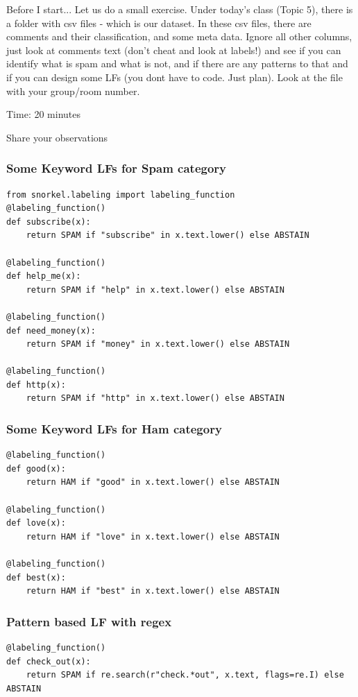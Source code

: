 \documentclass{beamer}
\begin{document}
\begin{frame}{Before I start...}
Let us do a small exercise. Under today's class (Topic 5), there is a folder with csv files - which is our dataset. In these csv files, there are comments and their classification, and some meta data. Ignore all other columns, just look at comments text (don't cheat and look at labels!) and see if you can identify what is spam and what is not, and if there are any patterns to that and if you can design some LFs (you dont have to code. Just plan). Look at the file with your group/room number. 

Time: 20 minutes
    
\end{frame}

\begin{frame}{}
    \Large Share your observations
\end{frame}

\begin{frame}[fragile]
\frametitle{Some Keyword LFs for Spam category}
\small
\begin{verbatim}
from snorkel.labeling import labeling_function
@labeling_function()
def subscribe(x):
    return SPAM if "subscribe" in x.text.lower() else ABSTAIN

@labeling_function()
def help_me(x):
    return SPAM if "help" in x.text.lower() else ABSTAIN

@labeling_function()
def need_money(x):
    return SPAM if "money" in x.text.lower() else ABSTAIN

@labeling_function()
def http(x):
    return SPAM if "http" in x.text.lower() else ABSTAIN
\end{verbatim}
\end{frame}

\begin{frame}[fragile]
\frametitle{Some Keyword LFs for Ham category}
\small
\begin{verbatim}
@labeling_function()
def good(x):
    return HAM if "good" in x.text.lower() else ABSTAIN

@labeling_function()
def love(x):
    return HAM if "love" in x.text.lower() else ABSTAIN

@labeling_function()
def best(x):
    return HAM if "best" in x.text.lower() else ABSTAIN
\end{verbatim}
\end{frame}

\begin{frame}[fragile]
\frametitle{Pattern based LF with regex}
\small
\begin{verbatim}
@labeling_function()
def check_out(x):
    return SPAM if re.search(r"check.*out", x.text, flags=re.I) else ABSTAIN
\end{verbatim}
\end{frame}
\end{document}
